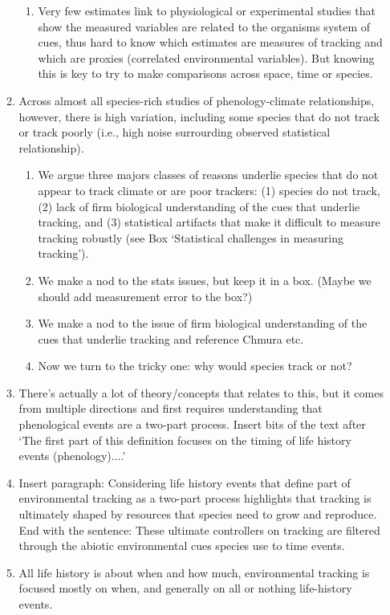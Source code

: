 \documentclass[11pt,letterpaper]{article}
\begin{document}
\begin{enumerate}
\begin{enumerate}
\begin{enumerate}
\item Very few estimates link to physiological or experimental studies that show the measured variables are related to the organisms system of cues, thus hard to know which estimates are measures of tracking and which are proxies (correlated environmental variables). But  knowing this is key to try to make comparisons across space, time or species.  
\end{enumerate}
\item Across almost all species-rich studies of phenology-climate relationships, however, there is high variation, including some species that do not track or track poorly (i.e., high noise surrourding observed statistical relationship). 
\begin{enumerate}
\item We argue three majors classes of reasons underlie species that do not appear to track climate or are poor trackers: (1) species do not track, (2) lack of firm biological understanding of the cues that underlie tracking, and (3) statistical artifacts that make it difficult to measure tracking robustly (see Box `Statistical challenges in measuring tracking'). 
\item We make a nod to the stats issues, but keep it in a box. (Maybe we should add measurement error to the box?)
\item We make a nod to the issue of firm biological understanding of the cues that underlie tracking and reference Chmura etc.
\item Now we turn to the tricky one: why would species track or not?
\end{enumerate}
\item There's actually a lot of theory/concepts that relates to this, but it comes from multiple directions and first requires understanding that phenological events are a two-part process. Insert bits of the text after `The first part of this definition focuses on the timing of life history events (phenology)....'
\item Insert paragraph: Considering life history events that define part of environmental tracking as a two-part process highlights that tracking is ultimately shaped by resources that species need to grow and reproduce. End with the sentence: These ultimate controllers on tracking are filtered through the abiotic environmental cues species use to time events.  
\item All life history is about when and how much, environmental tracking is focused mostly on when, and generally on all or nothing life-history events. 

\end{enumerate}
\end{enumerate}
\end{document}
